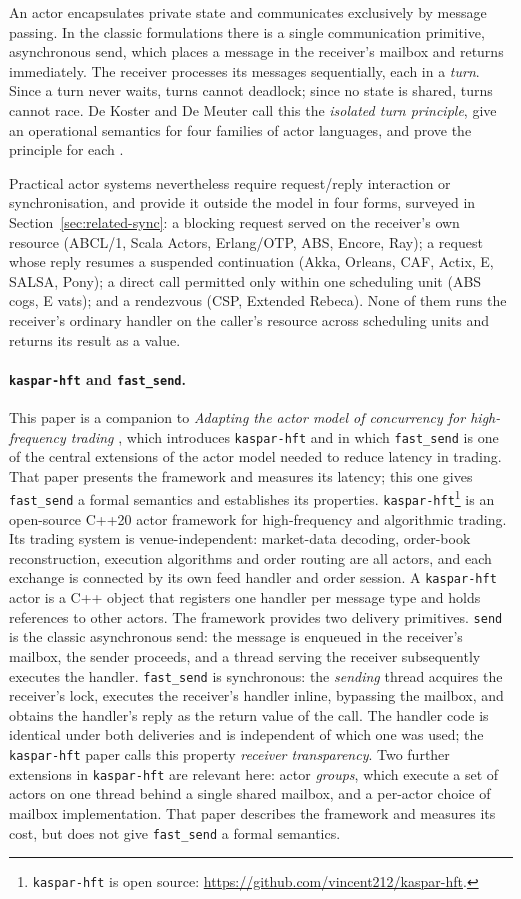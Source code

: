 \documentclass[11pt]{article}
\theoremstyle{definition}
\theoremstyle{remark}
\newcommand{\fs}{\texttt{fast\_send}}
\newcommand{\snd}{\texttt{send}}
\newcommand{\kh}{\texttt{kaspar-hft}}
\begin{document}
An actor encapsulates private state and communicates exclusively by message passing. In
the classic formulations \cite{hewitt1973,agha1986,agha1997} there is a single
communication primitive, asynchronous send, which places a message in the receiver's
mailbox and returns immediately. The receiver processes its messages sequentially, each
in a \emph{turn}. Since a turn never waits, turns cannot deadlock; since no state is
shared, turns cannot race. De Koster and De Meuter call this the \emph{isolated turn
principle}, give an operational semantics for four families of actor languages, and
prove the principle for each \cite{dekoster2024}.

Practical actor systems nevertheless require request/reply interaction or
synchronisation, and provide it outside the model in four forms, surveyed in
Section~\ref{sec:related-sync}: a blocking request served on the receiver's own resource
(ABCL/1, Scala Actors, Erlang/OTP, ABS, Encore, Ray); a request whose reply resumes a
suspended continuation (Akka, Orleans, CAF, Actix, E, SALSA, Pony); a direct call
permitted only within one scheduling unit (ABS cogs, E vats); and a rendezvous (CSP,
Extended Rebeca). None of them runs the receiver's ordinary handler on the caller's
resource across scheduling units and returns its result as a value.

\paragraph{\kh{} and \fs{}.} This paper is a companion to \emph{Adapting the actor
model of concurrency for high-frequency trading} \cite{mayeski2026fastsend}, which
introduces \kh{} and in which \fs{} is one of the central extensions of the actor model
needed to reduce latency in trading. That paper presents the framework and measures its
latency; this one gives \fs{} a formal semantics and establishes its properties.
\kh{}\footnote{\kh{} is open source: \url{https://github.com/vincent212/kaspar-hft}.}
is an open-source C++20 actor framework for high-frequency and algorithmic trading. Its
trading system is venue-independent: market-data decoding, order-book reconstruction,
execution algorithms and order routing are all actors, and each exchange is connected by
its own feed handler and order session. A \kh{} actor is a
C++ object that registers one handler per message type and holds references to other
actors. The framework provides two delivery primitives. \snd{} is the classic
asynchronous send: the message is enqueued in the receiver's mailbox, the sender
proceeds, and a thread serving the receiver subsequently executes the handler. \fs{} is
synchronous: the \emph{sending} thread acquires the receiver's lock, executes the
receiver's handler inline, bypassing the mailbox, and obtains the handler's reply as the
return value of the call. The handler code is identical under both deliveries and is
independent of which one was used; the \kh{} paper calls this property \emph{receiver
transparency}. Two further extensions in \kh{} are relevant here: actor \emph{groups},
which execute a set of actors on one thread behind a single shared mailbox, and a
per-actor choice of mailbox implementation. That paper describes the framework and
measures its cost, but does not give \fs{} a formal semantics.
\end{document}

